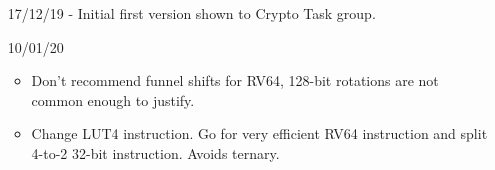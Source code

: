 
\begin{itemize}
\item[17/12/19] - Initial first version shown to Crypto Task group.
\item[10/01/20] \begin{itemize}
    \item Don't recommend funnel shifts for RV64, 128-bit rotations
          are not common enough to justify.
    \item Change LUT4 instruction. Go for very efficient RV64 instruction
          and split 4-to-2 32-bit instruction. Avoids ternary.
    \end{itemize}
\end{itemize}

